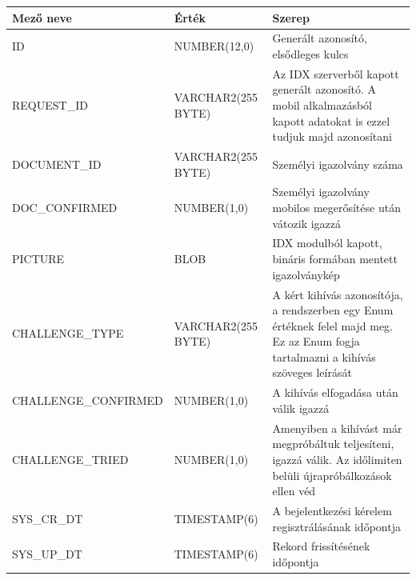 \begin{tabular}{|p{5.5cm}|p{3cm} |p{6cm}|}
   	\hline
	\textbf{Mező neve} & \textbf{Érték} & \textbf{Szerep}\\ \hline
	ID & NUMBER(12,0) & Generált azonosító, elsődleges kulcs \\ \hline
	REQUEST\_ID & VARCHAR2(255 BYTE) & Az IDX szerverből kapott generált azonosító. A mobil alkalmazásból kapott adatokat is ezzel tudjuk majd azonosítani \\ \hline
	DOCUMENT\_ID & VARCHAR2(255 BYTE)& Személyi igazolvány száma \\ \hline
	DOC\_CONFIRMED & NUMBER(1,0) & Személyi igazolvány mobilos megerősítése után vátozik igazzá\\ \hline
	PICTURE & BLOB & IDX modulból kapott, bináris formában mentett igazolványkép\\ \hline
	CHALLENGE\_TYPE & VARCHAR2(255 BYTE)& A kért kihívás azonosítója, a rendszerben egy Enum értéknek felel majd meg. Ez az Enum fogja tartalmazni a kihívás szöveges leírását \\ \hline
	CHALLENGE\_CONFIRMED & NUMBER(1,0)& A kihívás elfogadása után válik igazzá \\ \hline
	CHALLENGE\_TRIED & NUMBER(1,0) & Amenyiben a kihívást már megpróbáltuk teljesíteni, igazzá válik. Az időlimiten belüli újrapróbálkozások ellen véd \\ \hline
	SYS\_CR\_DT & TIMESTAMP(6)& A bejelentkezési kérelem regisztrálásának időpontja \\ \hline
	SYS\_UP\_DT & TIMESTAMP(6)& Rekord frissítésének időpontja \\ \hline
\end{tabular}




